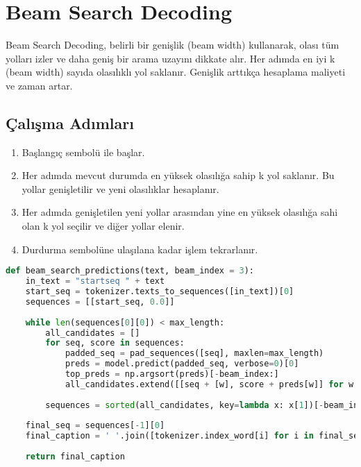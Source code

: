 \section{Beam Search Decoding}
Beam Search Decoding, belirli bir genişlik (beam width) kullanarak, olası tüm yolları izler ve daha geniş bir arama uzayını dikkate alır. Her adımda en iyi k (beam width) sayıda olasılıklı yol saklanır. Genişlik arttıkça hesaplama maliyeti  ve zaman artar.

\subsection{Çalışma Adımları}
\begin{enumerate}
	\item Başlangıç sembolü ile başlar.
	\item Her adımda mevcut durumda en yüksek olasılığa sahip k yol saklanır. Bu yollar genişletilir ve yeni olasılıklar hesaplanır.
	\item Her adımda genişletilen yeni yollar arasından yine en yüksek olasılığa sahi olan k yol seçilir ve diğer yollar elenir.
	\item Durdurma sembolüne ulaşılana kadar işlem tekrarlanır.
\end{enumerate}

\begin{lstlisting}[language=Python]
def beam_search_predictions(text, beam_index = 3):
    in_text = "startseq " + text
    start_seq = tokenizer.texts_to_sequences([in_text])[0]
    sequences = [[start_seq, 0.0]]
    
    while len(sequences[0][0]) < max_length:
        all_candidates = []
        for seq, score in sequences:
            padded_seq = pad_sequences([seq], maxlen=max_length)
            preds = model.predict(padded_seq, verbose=0)[0]
            top_preds = np.argsort(preds)[-beam_index:]
            all_candidates.extend([[seq + [w], score + preds[w]] for w in top_preds])
        
        sequences = sorted(all_candidates, key=lambda x: x[1])[-beam_index:]
    
    final_seq = sequences[-1][0]
    final_caption = ' '.join([tokenizer.index_word[i] for i in final_seq if i not in [tokenizer.word_index["startseq"], tokenizer.word_index.get("endseq", 0), tokenizer.word_index.get("<OOV>", 0)]])
    
    return final_caption
\end{lstlisting}

\newpage 